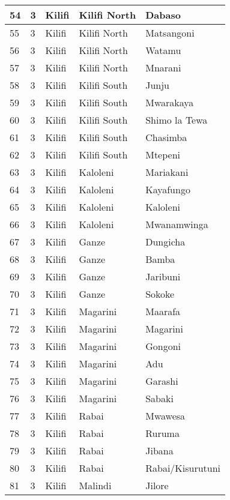 \begin{table}[!ht]
\begin{tabular}{|l|l|l|l|l|}
        54 & 3 & Kilifi & Kilifi North & Dabaso \\ \hline
        55 & 3 & Kilifi & Kilifi North & Matsangoni \\ \hline
        56 & 3 & Kilifi & Kilifi North & Watamu \\ \hline
        57 & 3 & Kilifi & Kilifi North & Mnarani \\ \hline
        58 & 3 & Kilifi & Kilifi South & Junju \\ \hline
        59 & 3 & Kilifi & Kilifi South & Mwarakaya \\ \hline
        60 & 3 & Kilifi & Kilifi South & Shimo la Tewa \\ \hline
        61 & 3 & Kilifi & Kilifi South & Chasimba \\ \hline
        62 & 3 & Kilifi & Kilifi South & Mtepeni \\ \hline
        63 & 3 & Kilifi & Kaloleni & Mariakani \\ \hline
        64 & 3 & Kilifi & Kaloleni & Kayafungo \\ \hline
        65 & 3 & Kilifi & Kaloleni & Kaloleni \\ \hline
        66 & 3 & Kilifi & Kaloleni & Mwanamwinga \\ \hline
        67 & 3 & Kilifi & Ganze & Dungicha \\ \hline
        68 & 3 & Kilifi & Ganze & Bamba \\ \hline
        69 & 3 & Kilifi & Ganze & Jaribuni \\ \hline
        70 & 3 & Kilifi & Ganze & Sokoke \\ \hline
        71 & 3 & Kilifi & Magarini & Maarafa \\ \hline
        72 & 3 & Kilifi & Magarini & Magarini \\ \hline
        73 & 3 & Kilifi & Magarini & Gongoni \\ \hline
        74 & 3 & Kilifi & Magarini & Adu \\ \hline
        75 & 3 & Kilifi & Magarini & Garashi \\ \hline
        76 & 3 & Kilifi & Magarini & Sabaki \\ \hline
        77 & 3 & Kilifi & Rabai & Mwawesa \\ \hline
        78 & 3 & Kilifi & Rabai & Ruruma \\ \hline
        79 & 3 & Kilifi & Rabai & Jibana \\ \hline
        80 & 3 & Kilifi & Rabai & Rabai/Kisurutuni \\ \hline
        81 & 3 & Kilifi & Malindi & Jilore \\ \hline

\end{tabular}
\end{table}
